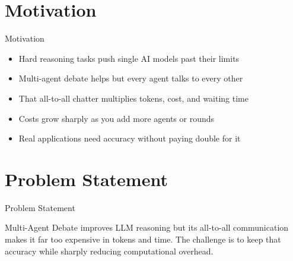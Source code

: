 \documentclass[10pt]{beamer}
\begin{document}
\section{Motivation}
\begin{frame}{Motivation}
\begin{itemize}
  \item Hard reasoning tasks push single AI models past their limits
  \item Multi-agent debate helps but every agent talks to every other
  \item That all-to-all chatter multiplies tokens, cost, and waiting time
  \item Costs grow sharply as you add more agents or rounds
  \item Real applications need accuracy without paying double for it
\end{itemize}
\end{frame}
\section{Problem Statement}
\begin{frame}{Problem Statement}
  \begin{block}{}
  Multi-Agent Debate improves LLM reasoning but its all-to-all communication makes it far too expensive in tokens and time. The challenge is to keep that accuracy while sharply reducing computational overhead.
  \end{block}
\end{frame}
\end{document}
